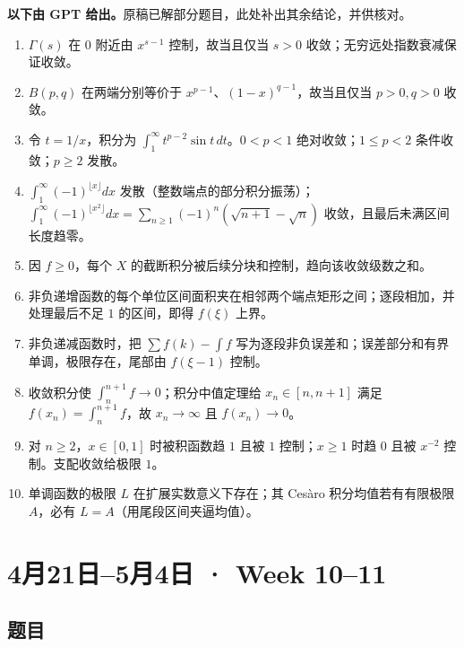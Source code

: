 \documentclass[UTF8,11pt, a4paper, oneside, fontset=none]{ctexbook}
\begin{document}
\noindent\textbf{以下由 GPT 给出。}原稿已解部分题目，此处补出其余结论，并供核对。
\begin{enumerate}
\item $\Gamma(s)$ 在 $0$ 附近由 $x^{s-1}$ 控制，故当且仅当 $s>0$ 收敛；无穷远处指数衰减保证收敛。
\item $B(p,q)$ 在两端分别等价于 $x^{p-1}$、$(1-x)^{q-1}$，故当且仅当 $p>0,q>0$ 收敛。
\item 令 $t=1/x$，积分为 $\int_1^\infty t^{p-2}\sin t\,dt$。$0<p<1$ 绝对收敛；$1\le p<2$ 条件收敛；$p\ge2$ 发散。
\item $\int_1^\infty(-1)^{\lfloor x\rfloor}dx$ 发散（整数端点的部分积分振荡）；$\int_1^\infty(-1)^{\lfloor x^2\rfloor}dx=\sum_{n\ge1}(-1)^n(\sqrt{n+1}-\sqrt n)$ 收敛，且最后未满区间长度趋零。
\item 因 $f\ge0$，每个 $X$ 的截断积分被后续分块和控制，趋向该收敛级数之和。
\item 非负递增函数的每个单位区间面积夹在相邻两个端点矩形之间；逐段相加，并处理最后不足 $1$ 的区间，即得 $f(\xi)$ 上界。
\item 非负递减函数时，把 $\sum f(k)-\int f$ 写为逐段非负误差和；误差部分和有界单调，极限存在，尾部由 $f(\xi-1)$ 控制。
\item 收敛积分使 $\int_n^{n+1}f\to0$；积分中值定理给 $x_n\in[n,n+1]$ 满足 $f(x_n)=\int_n^{n+1}f$，故 $x_n\to\infty$ 且 $f(x_n)\to0$。
\item 对 $n\ge2$，$x\in[0,1]$ 时被积函数趋 $1$ 且被 $1$ 控制；$x\ge1$ 时趋 $0$ 且被 $x^{-2}$ 控制。支配收敛给极限 $1$。
\item 单调函数的极限 $L$ 在扩展实数意义下存在；其 Ces\`aro 积分均值若有有限极限 $A$，必有 $L=A$（用尾段区间夹逼均值）。
\end{enumerate}

\clearpage

\section{4月21日--5月4日 · Week 10--11}

\subsection*{题目}
\end{document}
